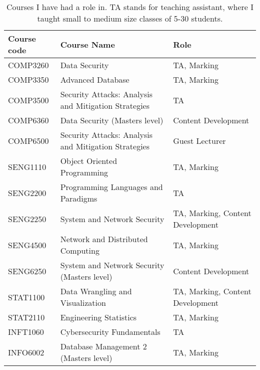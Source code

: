 \documentclass{myresume}
\begin{document}
        \begin{table}[H]
            \caption{Courses I have had a role in. TA stands for teaching assistant, where I taught small to medium size classes of 5-30 students.}
            \begin{center}
            \begin{tabular}{ l l l }
                    \hline
                    \textbf{Course code} & \textbf{Course Name} & \textbf{Role} \\
                    \hline
                    COMP3260 & Data Security & TA, Marking \\
                    COMP3350 & Advanced Database & TA, Marking \\
                    COMP3500 & Security Attacks: Analysis and Mitigation Strategies & TA \\
                    COMP6360 & Data Security (Masters level) & Content Development \\
                    COMP6500 & Security Attacks: Analysis and Mitigation Strategies & Guest Lecturer \\
                    SENG1110 & Object Oriented Programming & TA, Marking \\
                    SENG2200 & Programming Languages and Paradigms & TA \\
                    SENG2250 & System and Network Security & TA, Marking, Content Development \\
                    SENG4500 & Network and Distributed Computing & TA, Marking \\
                    SENG6250 & System and Network Security (Masters level) & Content Development \\
                    STAT1100 & Data Wrangling and Visualization & TA, Marking, Content Development \\
                    STAT2110 & Engineering Statistics & TA, Marking \\
                    INFT1060 & Cybersecurity Fundamentals & TA \\
                    INFO6002 & Database Management 2 (Masters level) & TA, Marking \\
                    \hline
            \end{tabular}
            \end{center}
        \end{table}



    	
	\nocite{*}
	
\end{document}

